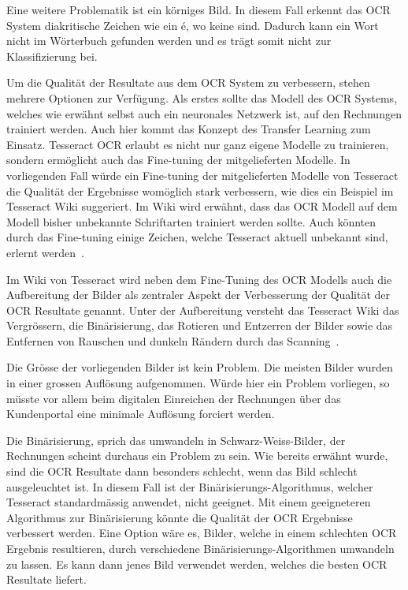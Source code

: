 Eine weitere Problematik ist ein körniges Bild. In diesem Fall erkennt das OCR System diakritische Zeichen wie ein é, wo keine sind. Dadurch kann ein Wort nicht im Wörterbuch gefunden werden und es trägt somit nicht zur Klassifizierung bei.

Um die Qualität der Resultate aus dem OCR System zu verbessern, stehen mehrere Optionen zur Verfügung. Als erstes sollte das Modell des OCR Systems, welches wie erwähnt selbst auch ein neuronales Netzwerk ist, auf den Rechnungen trainiert werden. Auch hier kommt das Konzept des Transfer Learning zum Einsatz. Tesseract OCR erlaubt es nicht nur ganz eigene Modelle zu trainieren, sondern ermöglicht auch das Fine-tuning der mitgelieferten Modelle. In vorliegenden Fall würde ein Fine-tuning der mitgelieferten Modelle von Tesseract die Qualität der Ergebnisse womöglich stark verbessern, wie dies ein Beispiel im Tesseract Wiki suggeriert. Im Wiki wird erwähnt, dass das OCR Modell auf dem Modell bisher unbekannte Schriftarten trainiert werden sollte. Auch könnten durch das Fine-tuning einige Zeichen, welche Tesseract aktuell unbekannt sind, erlernt werden~\autocite{TesseractTraining}.

Im Wiki von Tesseract wird neben dem Fine-Tuning des OCR Modells auch die Aufbereitung der Bilder als zentraler Aspekt der Verbesserung der Qualität der OCR Resultate genannt. Unter der Aufbereitung versteht das Tesseract Wiki das Vergrössern, die Binärisierung, das Rotieren und Entzerren der Bilder sowie das Entfernen von Rauschen und dunkeln Rändern durch das Scanning~\autocite{TesseractQuality}.

Die Grösse der vorliegenden Bilder ist kein Problem. Die meisten Bilder wurden in einer grossen Auflösung aufgenommen. Würde hier ein Problem vorliegen, so müsste vor allem beim digitalen Einreichen der Rechnungen über das Kundenportal eine minimale Auflösung forciert werden.

Die Binärisierung, sprich das umwandeln in Schwarz-Weiss-Bilder, der Rechnungen scheint durchaus ein Problem zu sein. Wie bereits erwähnt wurde, sind die OCR Resultate dann besonders schlecht, wenn das Bild schlecht ausgeleuchtet ist. In diesem Fall ist der Binärisierungs-Algorithmus, welcher Tesseract standardmässig anwendet, nicht geeignet. Mit einem geeigneteren Algorithmus zur Binärisierung könnte die Qualität der OCR Ergebnisse verbessert werden. Eine Option wäre es, Bilder, welche in einem schlechten OCR Ergebnis resultieren, durch verschiedene Binärisierungs-Algorithmen umwandeln zu lassen. Es kann dann jenes Bild verwendet werden, welches die besten OCR Resultate liefert.


